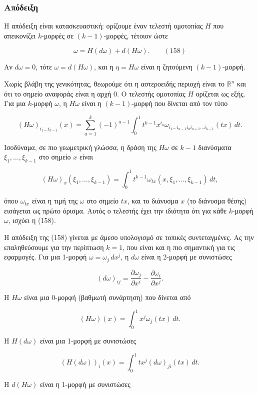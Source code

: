 \documentclass[12pt]{article}
\begin{document}
\subsubsection{Απόδειξη}

Η απόδειξη είναι κατασκευαστική: ορίζουμε έναν τελεστή ομοτοπίας $H$ που απεικονίζει $k$-μορφές σε $(k-1)$-μορφές, τέτοιον ώστε

\[
\omega = H(d\omega) + d(H\omega). \qquad (158)
\]

Αν $d\omega = 0$, τότε $\omega = d(H\omega)$, και η $\eta = H\omega$ είναι η ζητούμενη $(k-1)$-μορφή.

Χωρίς βλάβη της γενικότητας, θεωρούμε ότι η αστεροειδής περιοχή είναι το $\mathbb{R}^n$ και ότι το σημείο αναφοράς είναι η αρχή $0$. Ο τελεστής ομοτοπίας $H$ ορίζεται ως εξής. Για μια $k$-μορφή $\omega$, η $H\omega$ είναι η $(k-1)$-μορφή που δίνεται από τον τύπο

\[
(H\omega)_{i_1 \dots i_{k-1}}(x) = \sum_{a=1}^{k} (-1)^{a-1} \int_0^1 t^{k-1} x^{i_a} \omega_{i_1 \dots i_{a-1} i_a i_{a+1} \dots i_{k-1}}(tx) \, dt.
\]

Ισοδύναμα, σε πιο γεωμετρική γλώσσα, η δράση της $H\omega$ σε $k-1$ διανύσματα $\xi_1, \dots, \xi_{k-1}$ στο σημείο $x$ είναι

\[
(H\omega)_x(\xi_1, \dots, \xi_{k-1}) = \int_0^1 t^{k-1} \omega_{tx}(x, \xi_1, \dots, \xi_{k-1}) \, dt,
\]

όπου $\omega_{tx}$ είναι η τιμή της $\omega$ στο σημείο $tx$, και το διάνυσμα $x$ (το διάνυσμα θέσης) εισάγεται ως πρώτο όρισμα. Αυτός ο τελεστής έχει την ιδιότητα ότι για κάθε $k$-μορφή $\omega$, ισχύει η (158).

Η απόδειξη της (158) γίνεται με άμεσο υπολογισμό σε τοπικές συντεταγμένες. Ας την επαληθεύσουμε για την περίπτωση $k=1$, που είναι και η πιο σημαντική για τις εφαρμογές. Για μια 1-μορφή $\omega = \omega_j \, dx^j$, η $d\omega$ είναι η 2-μορφή με συνιστώσες

\[
(d\omega)_{ij} = \frac{\partial \omega_j}{\partial x^i} - \frac{\partial \omega_i}{\partial x^j}.
\]

Η $H\omega$ είναι μια 0-μορφή (βαθμωτή συνάρτηση) που δίνεται από

\[
(H\omega)(x) = \int_0^1 x^j \omega_j(tx) \, dt.
\]

Η $H(d\omega)$ είναι μια 1-μορφή με συνιστώσες

\[
(H(d\omega))_i(x) = \int_0^1 t x^j (d\omega)_{ji}(tx) \, dt.
\]

Η $d(H\omega)$ είναι η 1-μορφή με συνιστώσες
\end{document}
